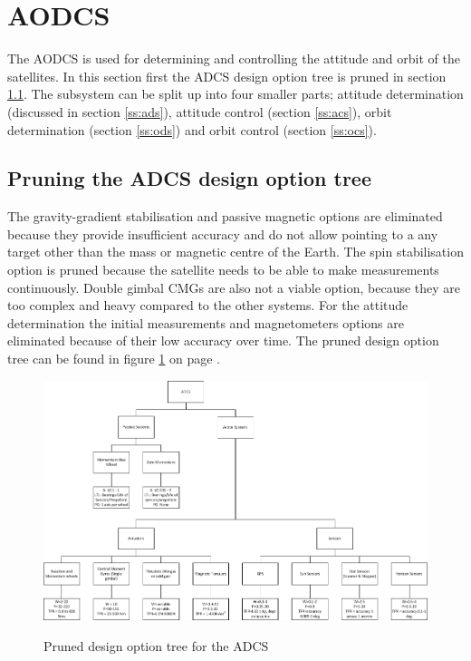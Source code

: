 \section{\ac{AODCS}}
The \ac{AODCS} is used for determining and controlling the attitude and orbit of the satellites. In this section first the \ac{ADCS} design option tree is pruned in section \ref{pruneADCS}. The subsystem can be split up into four smaller parts; attitude determination (discussed in section \ref{ss:ads}), attitude control (section \ref{ss:acs}), orbit determination (section \ref{ss:ods}) and orbit control (section \ref{ss:ocs}). 

\subsection{Pruning the \acs{ADCS} design option tree}
\label{pruneADCS}
The gravity-gradient stabilisation and passive magnetic options are eliminated because they provide insufficient accuracy and do not allow pointing to a any target other than the mass or magnetic centre of the Earth. The spin stabilisation option is pruned because the satellite needs to be able to make measurements continuously. Double gimbal \acp{CMG} are also not a viable option, because they are too complex and heavy compared to the other systems.
For the attitude determination the initial measurements and magnetometers options are eliminated because of their low accuracy over time.
The pruned design option tree can be found in figure \ref{fig:pruneADCS} on page \pageref{fig:pruneADCS}.

\begin{figure}
\centering
\includegraphics[width=1.0\textwidth, angle=90, bb =0 0 1009px 630px]{chapters/img/prunedADCStree.png}
\label{fig:pruneADCS}
\caption{Pruned design option tree for the \acs{ADCS}}
\end{figure}

